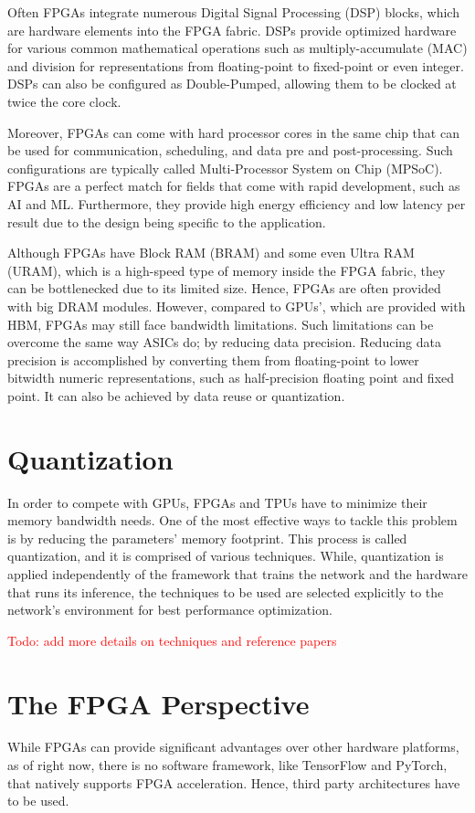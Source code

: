 Often FPGAs integrate numerous Digital Signal Processing (DSP) blocks, which are hardware elements into the FPGA fabric. DSPs provide optimized hardware for various common mathematical operations such as multiply-accumulate (MAC) and division for representations from floating-point to fixed-point or even integer. DSPs can also be configured as Double-Pumped, allowing them to be clocked at twice the core clock.

Moreover, FPGAs can come with hard processor cores in the same chip that can be used for communication, scheduling, and data pre and post-processing. Such configurations are typically called Multi-Processor System on Chip (MPSoC). FPGAs are a perfect match for fields that come with rapid development, such as AI and ML. Furthermore, they provide high energy efficiency and low latency per result due to the design being specific to the application.

Although FPGAs have Block RAM (BRAM) and some even Ultra RAM (URAM), which is a high-speed type of memory inside the FPGA fabric, they can be bottlenecked due to its limited size. Hence, FPGAs are often provided with big DRAM modules. However, compared to GPUs', which are provided with HBM, FPGAs may still face bandwidth limitations. Such limitations can be overcome the same way ASICs do; by reducing data precision. Reducing data precision is accomplished by converting them from floating-point to lower bitwidth numeric representations, such as half-precision floating point and fixed point. It can also be achieved by data reuse or quantization.

\section{Quantization}
In order to compete with GPUs, FPGAs and TPUs have to minimize their memory bandwidth needs. One of the most effective ways to tackle this problem is by reducing the parameters' memory footprint. This process is called quantization, and it is comprised of various techniques. While, quantization is applied independently of the framework that trains the network and the hardware that runs its inference, the techniques to be used are selected explicitly to the network's environment for best performance optimization.

\textcolor{red}{
Todo: add more details on techniques and reference papers
}

\section{The FPGA Perspective}
While FPGAs can provide significant advantages over other hardware platforms, as of right now, there is no software framework, like TensorFlow and PyTorch, that natively supports FPGA acceleration. Hence, third party architectures have to be used.

